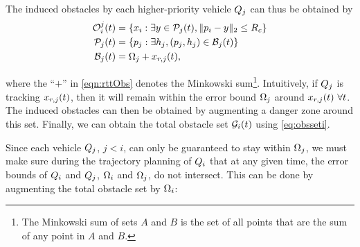 %

The induced obstacles by each higher-priority vehicle $Q_j$ can thus be obtained by
\begin{equation} 
\label{eqn:rttObs}
\begin{aligned}
\ioset_i^j(t) &=  \{\state_i: \exists y \in \pfrs_j(t), \|\pos_i - y\|_2 \le \rc \} \\
\pfrs_j(t) &= \{\pos_j: \exists \npos_j, (\pos_j, \npos_j) \in \boset_j(t)\} \\
\boset_j(t) &= \disckernel_j  + \state_{r,j}(t),
\end{aligned}
\end{equation}

\noindent where the ``$+$'' in \eqref{eqn:rttObs} denotes the Minkowski sum\footnote{The Minkowski sum of sets $A$ and $B$ is the set of all points that are the sum of any point in $A$ and $B$.}. Intuitively, if $Q_j$ is tracking $x_{r,j}(t)$, then it will remain within the error bound $\Omega_j$ around $x_{r,j}(t) ~\forall t$.  The induced obstacles can then be obtained by augmenting a danger zone around this set. Finally, we can obtain the total obstacle set $\mathcal{G}_i(t)$ using \eqref{eq:obsseti}. 

Since each vehicle $Q_j$, $j<i$, can only be guaranteed to stay within $\Omega_j$, we must make sure during the trajectory planning of $Q_i$ that at any given time, the error bounds of $Q_i$ and $Q_j$, $\Omega_i$ and $\Omega_j$, do not intersect. This can be done by augmenting the total obstacle set by $\Omega_i$:%

